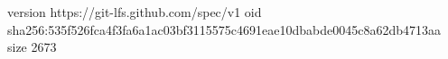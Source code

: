 version https://git-lfs.github.com/spec/v1
oid sha256:535f526fca4f3fa6a1ac03bf3115575c4691eae10dbabde0045c8a62db4713aa
size 2673
